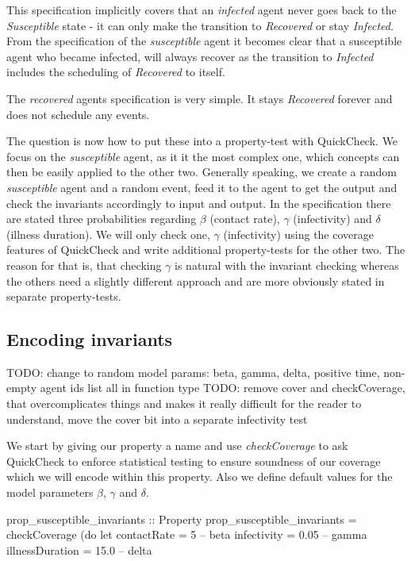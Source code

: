This specification implicitly covers that an \textit{infected} agent never goes back to the \textit{Susceptible} state - it can only make the transition to \textit{Recovered} or stay \textit{Infected}. From the specification of the \textit{susceptible} agent it becomes clear that a susceptible agent who became infected, will always recover as the transition to \textit{Infected} includes the scheduling of \textit{Recovered} to itself. 

The \textit{recovered} agents specification is very simple. It stays \textit{Recovered} forever and does not schedule any events.

The question is now how to put these into a property-test with QuickCheck. We focus on the \textit{susceptible} agent, as it it the most complex one, which concepts can then be easily applied to the other two. Generally speaking, we create a random \textit{susceptible} agent and a random event, feed it to the agent to get the output and check the invariants accordingly to input and output. In the specification there are stated three probabilities regarding $\beta$ (contact rate), $\gamma$ (infectivity) and $\delta$ (illness duration). We will only check one, $\gamma$ (infectivity) using the coverage features of QuickCheck and write additional property-tests for the other two. The reason for that is, that checking $\gamma$ is natural with the invariant checking whereas the others need a slightly different approach and are more obviously stated in separate property-tests.

\subsection{Encoding invariants}
TODO: change to random model params: beta, gamma, delta, positive time, non-empty agent ids list all in function type
TODO: remove cover and checkCoverage, that overcomplicates things and makes it really difficult for the reader to understand, move the cover bit into a separate infectivity test

We start by giving our property a name and use \textit{checkCoverage} to ask QuickCheck to enforce statistical testing to ensure soundness of our coverage which we will encode within this property. Also we define default values for the model parameters $\beta$, $\gamma$ and $\delta$.

\begin{HaskellCode}
prop_susceptible_invariants :: Property
prop_susceptible_invariants = checkCoverage (do
  let contactRate     = 5     -- beta
      infectivity     = 0.05  -- gamma
      illnessDuration = 15.0  -- delta
\end{HaskellCode}

